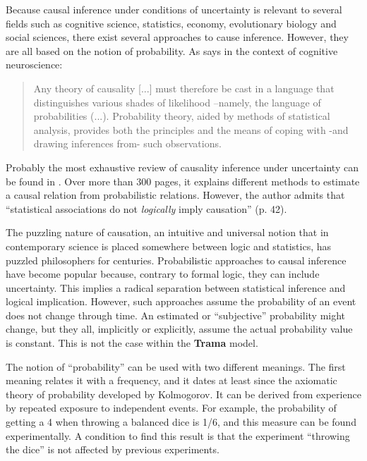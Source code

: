 \documentclass[
		twoside,openright,titlepage,numbers=noenddot,manychapters,
		headinclude,%
                footinclude=false,cleardoublepage=empty,
                BCOR=5mm,
		fontsize=11pt, %
                 enabledeprecatedfontcommands]{scrreprt}
\begin{document}
Because causal inference under conditions of uncertainty is relevant to several fields such as cognitive science, statistics, economy, evolutionary biology and social sciences, there exist several approaches to cause inference. However, they are all based on the notion of probability. As \cite[page 1]{purves} says in the context of cognitive neuroscience:

\begin{quote}
Any theory of causality [...] must therefore be cast in a language that distinguishes various shades of likelihood --namely, the language of probabilities (...). Probability theory, aided by methods of statistical analysis, provides both the principles and the means of coping with -and drawing inferences from- such observations.
\end{quote}

Probably the most exhaustive review of causality inference under uncertainty can be found in \cite{pearl2009}. Over more than 300 pages, it explains different methods to estimate a causal relation from probabilistic relations. However, the author admits that ``statistical associations do not \emph{logically} imply causation'' (p. 42). 

The puzzling nature of causation, an intuitive and universal notion that in contemporary science is placed somewhere between logic and statistics, has puzzled philosophers for centuries. Probabilistic approaches to causal inference have become popular because, contrary to formal logic, they can include uncertainty. This implies a radical separation between  statistical inference and logical implication.  However, such approaches assume the probability of an event does not change through time. An estimated or ``subjective'' probability might change, but they all, implicitly or explicitly, assume the actual probability value is constant. This is not the case within the \textbf{Trama} model.

The notion of ``probability'' can be used with two different meanings. The first meaning relates it with a frequency, and it dates at least since the axiomatic theory of probability developed by Kolmogorov. It can be derived from experience by repeated exposure to independent events. For example, the probability of getting a 4 when throwing a balanced dice is 1/6, and this measure can be found experimentally. A condition to find this result is that the experiment ``throwing the dice'' is not affected by previous experiments.
\end{document}
